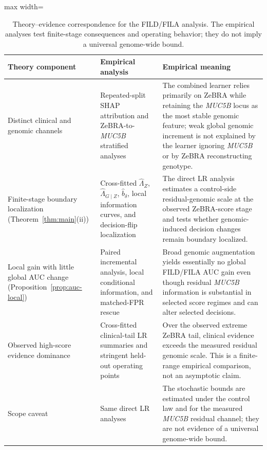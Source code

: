 \begin{table}[!t]
\caption{Theory--evidence correspondence for the FILD/FILA analysis. The empirical analyses test finite-stage consequences and operating behavior; they do not imply a universal genome-wide bound.}
\label{tab:theory-evidence-map}
\centering\footnotesize
\setlength{\tabcolsep}{4pt}
\renewcommand{\arraystretch}{1.08}
\begin{adjustbox}{max width=\textwidth}
\begin{tabular}{p{}p{}p{}}
\toprule
Theory component & Empirical analysis & Empirical meaning\\
\midrule
Distinct clinical and genomic channels & Repeated-split SHAP attribution and ZeBRA-to-\textit{MUC5B} stratified analyses & The combined learner relies primarily on ZeBRA while retaining the \textit{MUC5B} locus as the most stable genomic feature; weak global genomic increment is not explained by the learner ignoring \textit{MUC5B} or by ZeBRA reconstructing genotype.\\
Finite-stage boundary localization (Theorem~\ref{thm:main}(ii)) & Cross-fitted $\widehat\Lambda_Z$, $\widehat\Lambda_{G\mid Z}$, $\widehat b_\delta$, local information curves, and decision-flip localization & The direct LR analysis estimates a control-side residual-genomic scale at the observed ZeBRA-score stage and tests whether genomic-induced decision changes remain boundary localized.\\
Local gain with little global AUC change (Proposition~\ref{prop:auc-local}) & Paired incremental analysis, local conditional information, and matched-FPR rescue & Broad genomic augmentation yields essentially no global FILD/FILA AUC gain even though residual \textit{MUC5B} information is substantial in selected score regimes and can alter selected decisions.\\
Observed high-score evidence dominance & Cross-fitted clinical-tail LR summaries and stringent held-out operating points & Over the observed extreme ZeBRA tail, clinical evidence exceeds the measured residual genomic scale. This is a finite-range empirical comparison, not an asymptotic claim.\\
Scope caveat & Same direct LR analyses & The stochastic bounds are estimated under the control law and for the measured \textit{MUC5B} residual channel; they are not evidence of a universal genome-wide bound.\\
\bottomrule
\end{tabular}
\end{adjustbox}
\end{table}

